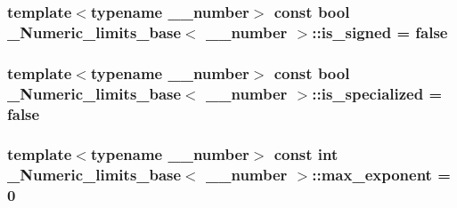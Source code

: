 \subsubsection[{is\+\_\+signed}]{\setlength{\rightskip}{0pt plus 5cm}template$<$typename \+\_\+\+\_\+number$>$ const {\bf bool} {\bf \+\_\+\+Numeric\+\_\+limits\+\_\+base}$<$ \+\_\+\+\_\+number $>$\+::is\+\_\+signed = {\bf false}\hspace{0.3cm}{\ttfamily [static]}}\label{class__Numeric__limits__base_a8ec6556a2cfa7db8922c44806de5fc16}
\hypertarget{class__Numeric__limits__base_a16f54a874c886c7a9bb51e6a5ccf025c}{}
\subsubsection[{is\+\_\+specialized}]{\setlength{\rightskip}{0pt plus 5cm}template$<$typename \+\_\+\+\_\+number$>$ const {\bf bool} {\bf \+\_\+\+Numeric\+\_\+limits\+\_\+base}$<$ \+\_\+\+\_\+number $>$\+::is\+\_\+specialized = {\bf false}\hspace{0.3cm}{\ttfamily [static]}}\label{class__Numeric__limits__base_a16f54a874c886c7a9bb51e6a5ccf025c}
\hypertarget{class__Numeric__limits__base_ae22a7d4a4619fd7e01cd8171b5a41f28}{}
\subsubsection[{max\+\_\+exponent}]{\setlength{\rightskip}{0pt plus 5cm}template$<$typename \+\_\+\+\_\+number$>$ const int {\bf \+\_\+\+Numeric\+\_\+limits\+\_\+base}$<$ \+\_\+\+\_\+number $>$\+::max\+\_\+exponent = 0\hspace{0.3cm}{\ttfamily [static]}}\label{class__Numeric__limits__base_ae22a7d4a4619fd7e01cd8171b5a41f28}
\hypertarget{class__Numeric__limits__base_a76cf75d2e3becdc0f2e1db245ca408fb}{}
